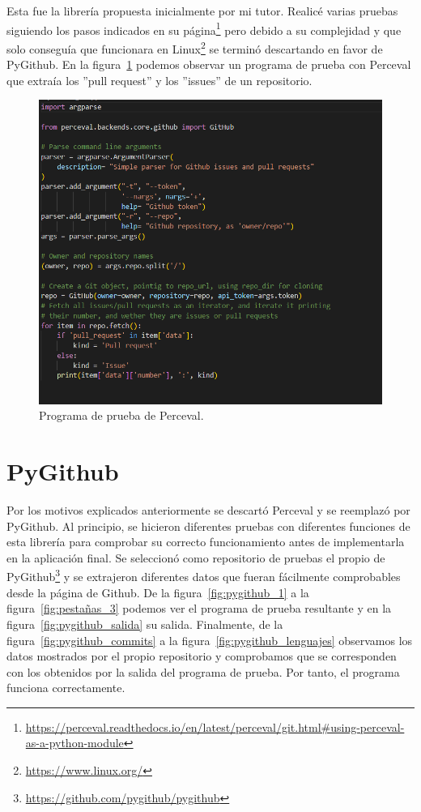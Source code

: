 \documentclass[a4paper, 12pt]{book}
\begin{document}
Esta fue la librería propuesta inicialmente por mi tutor. Realicé varias pruebas siguiendo los pasos indicados en su página\footnote{\url{https://perceval.readthedocs.io/en/latest/perceval/git.html#using-perceval-as-a-python-module}} pero debido a su complejidad y que solo conseguía que funcionara en Linux\footnote{\url{https://www.linux.org/}} se terminó descartando en favor de PyGithub. En la figura~\ref{fig:perceval} podemos observar un programa de prueba con Perceval que extraía los ''pull request'' y los ''issues'' de un repositorio.

\begin{figure}
    \centering
    \includegraphics[width=1\textwidth, keepaspectratio]{img/perceval.png}
    \caption{Programa de prueba de Perceval.}\label{fig:perceval}
\end{figure}

\section{PyGithub}

Por los motivos explicados anteriormente se descartó Perceval y se reemplazó por PyGithub. Al principio, se hicieron diferentes pruebas con diferentes funciones de esta librería para comprobar su correcto funcionamiento antes de implementarla en la aplicación final. Se seleccionó como repositorio de pruebas el propio de PyGithub\footnote{\url{https://github.com/pygithub/pygithub}} y se extrajeron diferentes datos que fueran fácilmente comprobables desde la página de Github. De la figura~\ref{fig:pygithub_1} a la figura~\ref{fig:pestañas_3} podemos ver el programa de prueba resultante y en la figura~\ref{fig:pygithub_salida} su salida. Finalmente, de la figura~\ref{fig:pygithub_commits} a la figura~\ref{fig:pygithub_lenguajes} observamos los datos mostrados por el propio repositorio y comprobamos que se corresponden con los obtenidos por la salida del programa de prueba. Por tanto, el programa funciona correctamente.
\end{document}
